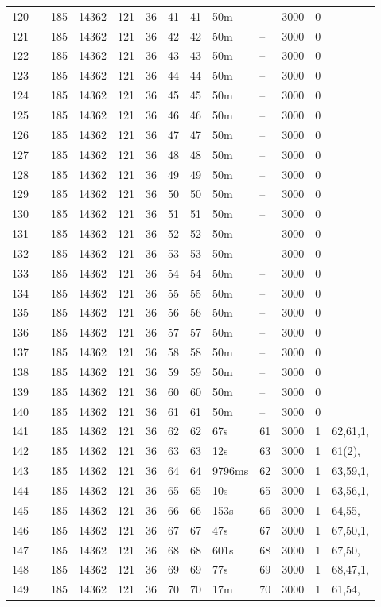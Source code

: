\documentclass{article}
\begin{document}
\begin{longtable}{|l |l |l |l |l |l |l |l |l |l |l |l |l |}
120&&185&14362&121&36&41&41&50m&--&3000&0&\\
121&&185&14362&121&36&42&42&50m&--&3000&0&\\
122&&185&14362&121&36&43&43&50m&--&3000&0&\\
123&&185&14362&121&36&44&44&50m&--&3000&0&\\
124&&185&14362&121&36&45&45&50m&--&3000&0&\\
125&&185&14362&121&36&46&46&50m&--&3000&0&\\
126&&185&14362&121&36&47&47&50m&--&3000&0&\\
127&&185&14362&121&36&48&48&50m&--&3000&0&\\
128&&185&14362&121&36&49&49&50m&--&3000&0&\\
129&&185&14362&121&36&50&50&50m&--&3000&0&\\
130&&185&14362&121&36&51&51&50m&--&3000&0&\\
131&&185&14362&121&36&52&52&50m&--&3000&0&\\
132&&185&14362&121&36&53&53&50m&--&3000&0&\\
133&&185&14362&121&36&54&54&50m&--&3000&0&\\
134&&185&14362&121&36&55&55&50m&--&3000&0&\\
135&&185&14362&121&36&56&56&50m&--&3000&0&\\
136&&185&14362&121&36&57&57&50m&--&3000&0&\\
137&&185&14362&121&36&58&58&50m&--&3000&0&\\
138&&185&14362&121&36&59&59&50m&--&3000&0&\\
139&&185&14362&121&36&60&60&50m&--&3000&0&\\
140&&185&14362&121&36&61&61&50m&--&3000&0&\\
141&&185&14362&121&36&62&62&67s&61&3000&1&62,61,1,\\
142&&185&14362&121&36&63&63&12s&63&3000&1&61(2),\\
143&&185&14362&121&36&64&64&9796ms&62&3000&1&63,59,1,\\
144&&185&14362&121&36&65&65&10s&65&3000&1&63,56,1,\\
145&&185&14362&121&36&66&66&153s&66&3000&1&64,55,\\
146&&185&14362&121&36&67&67&47s&67&3000&1&67,50,1,\\
147&&185&14362&121&36&68&68&601s&68&3000&1&67,50,\\
148&&185&14362&121&36&69&69&77s&69&3000&1&68,47,1,\\
149&&185&14362&121&36&70&70&17m&70&3000&1&61,54,\\

\end{longtable}
\end{document}
